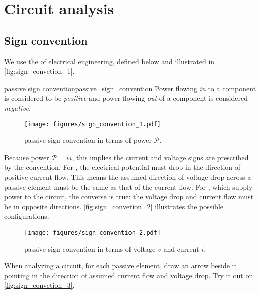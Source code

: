 \documentclass[electronics.tex]{subfiles}
\begin{document}
\chapter{Circuit analysis}
\tags{}
\label{ch:circuitanalysis}

\section{Sign convention}
\tags{}

We use the  of electrical engineering, defined below and illustrated in \autoref{fig:sign_convetion_1}.
\tags{}

\begin{Definition}{passive sign convention}{passive_sign_convention}
	Power flowing \emph{in} to a component is considered to be \emph{positive} and power flowing \emph{out} of a component is considered \emph{negative}.
\end{Definition}

\begin{figure}[b]
	\centering
	\texttt{[image: figures/sign\_convention\_1.pdf]}
	\caption{passive sign convention in terms of power $\mathcal{P}$.}
	\label{fig:sign_convetion_1}
\end{figure}

Because power $\mathcal{P} = v i$, this implies the current and voltage signs are prescribed by the convention.
For , the electrical potential must drop in the direction of positive current flow.
This means the assumed direction of voltage drop across a passive element must be the same as that of the current flow.
For , which supply power to the circuit, the converse is true:
the voltage drop and current flow must be in opposite directions.
\autoref{fig:sign_convetion_2} illustrates the possible configurations.

\begin{figure}[b]
	\centering
	\texttt{[image: figures/sign\_convention\_2.pdf]}
	\caption{passive sign convention in terms of voltage $v$ and current $i$.}
	\label{fig:sign_convetion_2}
\end{figure}

When analyzing a circuit, for each passive element, draw an arrow beside it pointing in the direction of assumed current flow and voltage drop.
Try it out on \autoref{fig:sign_convetion_3}.
\end{document}
